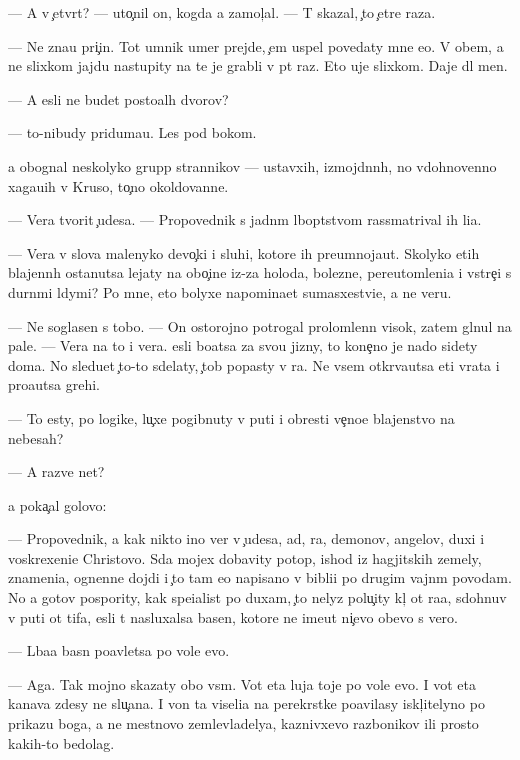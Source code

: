 \documentclass[10pt]{book}
\begin{document}
— A v {\c}etv{\e}rt{\yi}{\y}? — uto{\c}nil on, kogda {\y}a zamol{\c}al. — T{\yi} skazal, {\c}to {\c}et{\yi}re raza.

— Ne zna{\y}u pri{\c}in{\yi}. Tot umnik umer prejde, {\c}em uspel povedaty mne {\y}e{\y}o. V ob{\x}em, {\y}a ne slixkom jajdu nastupity na te je grabli v p{\ia}t{\yi}{\y} raz. Eto uje slixkom. Daje dl{\ia} men{\ia}.

— A {\y}esli ne budet posto{\y}al{\yi}h dvorov?

— {\C}to-nibudy priduma{\y}u. Les pod bokom.

{\Y}a obognal neskolyko grupp strannikov — ustavxih, izmojd{\e}nn{\yi}h, no vdohnovenno xaga{\y}u{\x}ih v Kruso, to{\c}no okoldovann{\yi}{\y}e.

— Vera tvorit {\c}udesa. — Propovednik s jadn{\yi}m l{\iu}bop{\yi}tstvom rassmatrival ih li{\q}a.

— Vera v slova malenyko{\y} devo{\c}ki i sluhi, kotor{\yi}{\y}e ih preumnoja{\y}ut. Skolyko etih blajenn{\yi}h ostanutsa lejaty na obo{\c}ine iz-za holoda, bolezne{\y}, pereutomleni{\y}a i vstre{\c}i s durn{\yi}mi l{\iu}dymi? Po mne, eto bolyxe napomina{\y}et sumasxestvi{\y}e, a ne veru.

— Ne soglasen s tobo{\y}. — On ostorojno potrogal prolomlenn{\yi}{\y} visok, zatem gl{\ia}nul na pale{\q}. — Vera na to i vera. {\Y}esli bo{\y}atsa za svo{\y}u jizny, to kone{\c}no je nado sidety doma. No sledu{\y}et {\c}to-to sdelaty, {\c}tob{\yi} popasty v ra{\y}. Ne vsem otkr{\yi}va{\y}utsa eti vrata i pro{\x}a{\y}utsa grehi.

— To {\y}esty, po logike, lu{\c}xe pogibnuty v puti i obresti ve{\c}no{\y}e blajenstvo na nebesah?

— A razve net?

{\Y}a poka{\c}al golovo{\y}:

— Propovednik, {\y}a kak nikto ino{\y} ver{\iu} v {\c}udesa, ad, ra{\y}, demonov, angelov, duxi i voskrexeni{\y}e Christovo. S{\iu}da mojex dobavity potop, ishod iz hagjitskih zemely, znameni{\y}a, ognenn{\yi}{\y}e dojdi i {\c}to tam {\y}e{\x}o napisano v bibli{\y}i po drugim vajn{\yi}m povodam. No {\y}a gotov pospority, kak spe{\q}ialist po duxam, {\c}to nelyz{\ia} polu{\c}ity kl{\iu}{\c} ot ra{\y}a, sdohnuv v puti ot tifa, {\y}esli t{\yi} nasluxalsa basen, kotor{\yi}{\y}e ne ime{\y}ut ni{\c}evo ob{\x}evo s vero{\y}.

— L{\iu}ba{\y}a basn{\ia} po{\y}avl{\ia}{\y}etsa po vole {\Y}evo.

— Aga. Tak mojno skazaty obo vs{\e}m. Vot eta luja toje po vole {\y}evo. I vot eta kanava zdesy ne slu{\c}a{\y}na. I von ta viseli{\q}a na perekr{\e}stke po{\y}avilasy iskl{\iu}{\c}itelyno po prikazu boga, a ne mestnovo zemlevladely{\q}a, kaznivxevo razbo{\y}nikov ili prosto kakih-to bedolag.
\end{document}
